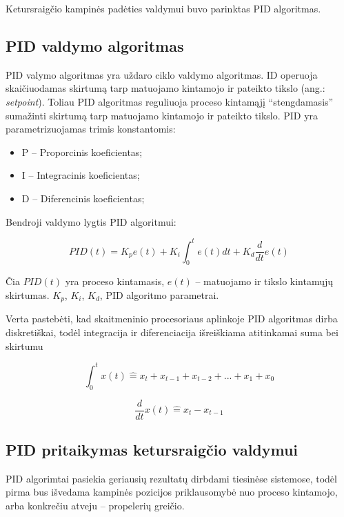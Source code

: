 \documentclass[12pt, a4paper, lithuanian, final]{article}
\begin{document}
Ketursraigčio kampinės padėties valdymui buvo parinktas PID algoritmas.

\subsection{PID valdymo algoritmas}

PID valymo algoritmas yra uždaro ciklo valdymo algoritmas.
ID operuoja skaičiuodamas skirtumą tarp matuojamo kintamojo ir pateikto tikslo (ang.: \textit{setpoint}).
Toliau PID algoritmas reguliuoja proceso kintamąjį "`stengdamasis"' sumažinti skirtumą tarp matuojamo kintamojo ir pateikto tikslo.
PID yra parametrizuojamas trimis konstantomis:

\begin{itemize}
	\item P -- Proporcinis koeficientas;
	\item I -- Integracinis koeficientas;
	\item D -- Diferencinis koeficientas;
\end{itemize}

Bendroji valdymo lygtis PID algoritmui:

\begin{equation}
	PID(t) = K_p e(t) + K_i \int_0^t e(t) dt + K_d \dfrac{d}{dt} e(t)
\end{equation}

Čia $PID(t)$ yra proceso kintamasis, $e(t)$ -- matuojamo ir tikslo kintamųjų skirtumas.
$K_p$, $K_i$, $K_d$, PID algoritmo parametrai.

Verta pastebėti, kad skaitmeninio procesoriaus aplinkoje PID algoritmas dirba diskretiškai, todėl integracija ir diferenciacija išreiškiama atitinkamai suma bei skirtumu

\begin{equation}
	\int_0^t x(t) \widehat{=} x_t + x_{t - 1} + x_{t - 2} + ... + x_{1} + x_{0}
\end{equation}

\begin{equation}
	\dfrac{d}{dt}x(t) \widehat{=} x_t - x_{t - 1}
\end{equation}



\subsection{PID pritaikymas ketursraigčio valdymui}

PID algorimtai pasiekia geriausių rezultatų dirbdami tiesinėse sistemose, todėl pirma bus išvedama kampinės pozicijos priklausomybė nuo proceso kintamojo, arba konkrečiu atveju -- propelerių greičio.
\end{document}
